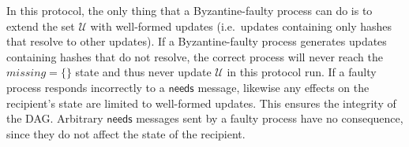 \documentclass[manuscript,anonymous]{acmart}
\begin{document}
In this protocol, the only thing that a Byzantine-faulty process can do is to extend the set $\mathcal{U}$ with well-formed updates (i.e.\ updates containing only hashes that resolve to other updates).
If a Byzantine-faulty process generates updates containing hashes that do not resolve, the correct process will never reach the $\mathit{missing} = \{\}$ state and thus never update $\mathcal{U}$ in this protocol run.
If a faulty process responds incorrectly to a $\mathsf{needs}$ message, likewise any effects on the recipient's state are limited to well-formed updates.
This ensures the integrity of the DAG.
Arbitrary $\mathsf{needs}$ messages sent by a faulty process have no consequence, since they do not affect the state of the recipient.

\end{document}
